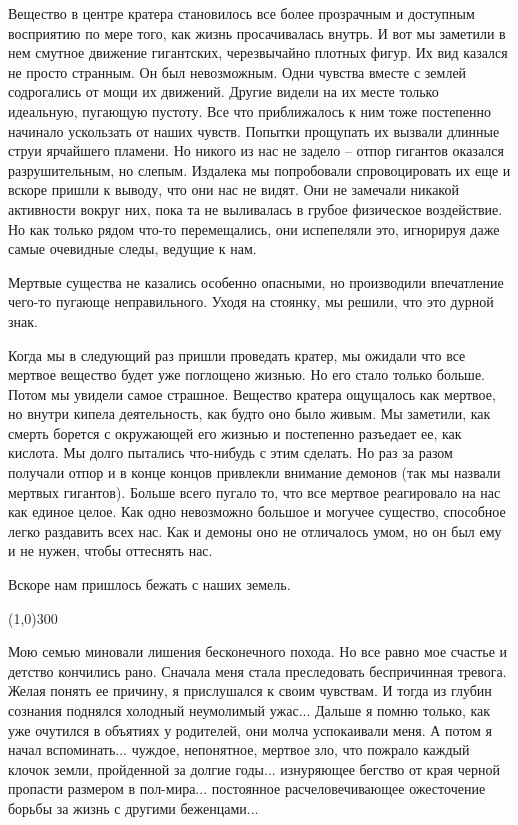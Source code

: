\documentclass[12pt,a4paper]{article}
\newcommand{\sep}{
	\begin{center}
		\line(1,0){300}
	\end{center}
}
\begin{document}
Вещество в центре кратера становилось все более прозрачным и доступным восприятию по мере того, как жизнь просачивалась внутрь. И вот мы заметили в нем смутное движение гигантских, черезвычайно плотных фигур. Их вид казался не просто странным. Он был невозможным. Одни чувства вместе с землей содрогались от мощи их движений. Другие видели на их месте только идеальную, пугающую пустоту. Все что приближалось к ним тоже постепенно начинало ускользать от наших чувств. Попытки прощупать их вызвали длинные струи ярчайшего пламени. Но никого из нас не задело -- отпор гигантов оказался разрушительным, но слепым. Издалека мы попробовали спровоцировать их еще и вскоре пришли к выводу, что они нас не видят. Они не замечали никакой активности вокруг них, пока та не выливалась в грубое физическое воздействие. Но как только рядом что-то перемещались, они испепеляли это, игнорируя даже самые очевидные следы, ведущие к нам.

Мертвые существа не казались особенно опасными, но производили впечатление чего-то пугающе неправильного. Уходя на стоянку, мы решили, что это дурной знак.

Когда мы в следующий раз пришли проведать кратер, мы ожидали что все мертвое вещество будет уже поглощено жизнью. Но его стало только больше. Потом мы увидели самое страшное. Вещество кратера ощущалось как мертвое, но внутри кипела деятельность, как будто оно было живым. Мы заметили, как смерть борется с окружающей его жизнью и постепенно разъедает ее, как кислота. Мы долго пытались что-нибудь с этим сделать. Но раз за разом получали отпор и в конце концов привлекли внимание демонов (так мы назвали мертвых гигантов). Больше всего пугало то, что все мертвое реагировало на нас как единое целое. Как одно невозможно большое и могучее существо, способное легко раздавить всех нас. Как и демоны оно не отличалось умом, но он был ему и не нужен, чтобы оттеснять нас.

Вскоре нам пришлось бежать с наших земель.

\sep

Мою семью миновали лишения бесконечного похода. Но все равно мое счастье и детство кончились рано. Сначала меня стала преследовать беспричинная тревога. Желая понять ее причину, я прислушался к своим чувствам. И тогда из глубин сознания поднялся холодный неумолимый ужас... Дальше я помню только, как уже очутился в объятиях у родителей, они молча успокаивали меня. А потом я начал вспоминать... чуждое, непонятное, мертвое зло, что пожрало каждый клочок земли, пройденной за долгие годы... изнуряющее бегство от края черной пропасти размером в пол-мира... постоянное расчеловечивающее ожесточение борьбы за жизнь с другими беженцами...
\end{document}

